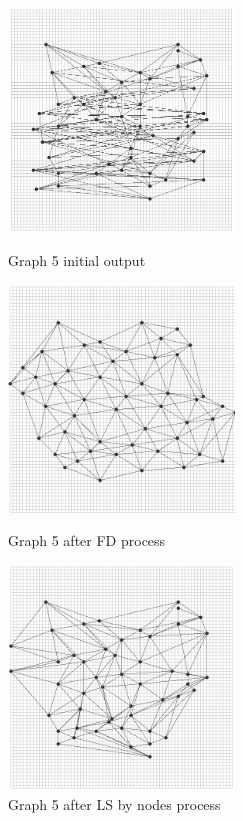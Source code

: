 \begin{figure}[htbp]
\label{fig:g5}
\centering
\begin{minipage}[t]{0.48\textwidth}
\centering
\includegraphics[width=6cm]{g5_initial.PNG}
\caption{Graph 5 initial output}
\end{minipage}
\begin{minipage}[t]{0.48\textwidth}
\centering
\includegraphics[width=6cm]{g5_FD.png}
\caption{Graph 5 after FD process}
\end{minipage}
\begin{minipage}[t]{0.48\textwidth}
\centering
\includegraphics[width=6cm]{g5_LSNode.PNG}
\caption{Graph 5 after LS by nodes process}
\end{minipage}
\begin{minipage}[t]{0.48\textwidth}
\centering

\end{minipage}
\end{figure}
